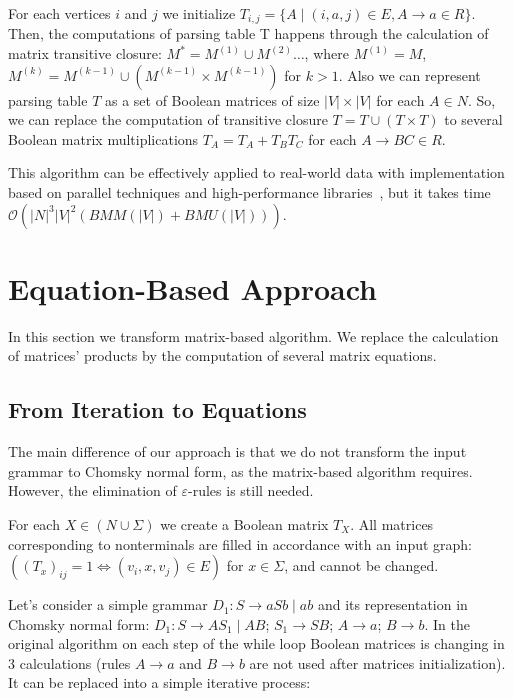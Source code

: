\documentclass[sigconf]{acmart}
\begin{document}
For each vertices $i$ and $j$ we initialize $T_{i,j} = \{A \mid (i, a, j) \in E, A \rightarrow a \in R\}$. 
Then, the computations of parsing table T happens through the calculation of matrix transitive closure: $M^* = M^{(1)} \cup M^{(2)} \dots$, where $M^{(1)} = M$, $M^{(k)} = M^{(k-1)} \cup (M^{(k-1)} \times M^{(k-1)})$ for $k > 1$.
Also we can represent parsing table $T$ as a set of Boolean matrices of size $|V| \times |V|$ for each $A \in N$. So, we can replace the computation of transitive closure $T = T \cup (T \times T)$ to several Boolean matrix multiplications $T_A = T_A + T_B T_C$ for each $A \rightarrow BC \in R$.

This algorithm can be effectively applied to real-world data with implementation based on parallel techniques and high-performance libraries~\cite{mishin2019evaluation}, but it takes time $\mathcal{O}(|N|^3|V|^2(BMM(|V|) + BMU(|V|)))$. 


\section{Equation-Based Approach}

In this section we transform matrix-based algorithm. 
We replace the calculation of matrices' products by the computation of several matrix equations.

\subsection{From Iteration to Equations}

The main difference of our approach is that we do not transform the input grammar to Chomsky normal form, as the matrix-based algorithm requires. 
However, the elimination of $\varepsilon$-rules is still needed.

For each $X \in (N \cup \Sigma)$ we create a Boolean matrix $T_X$. 
All matrices corresponding to nonterminals are filled in accordance with an input graph: $((T_x)_{ij} = 1 \iff (v_i, x, v_j) \in E)$ for  $x \in \Sigma$, and cannot be changed. 


Let's consider a simple grammar $D_1 : S \rightarrow aSb \mid ab$ and its representation in Chomsky normal form: $D_1 : S \rightarrow AS_1 \mid AB$; $ S_1 \rightarrow SB$; $ A \rightarrow a$; $B \rightarrow b$.
In the original algorithm on each step of the while loop Boolean matrices is changing in 3 calculations (rules $ A \rightarrow a$ and $B \rightarrow b$ are not used after matrices initialization). It can be replaced into a simple iterative process:
\end{document}
